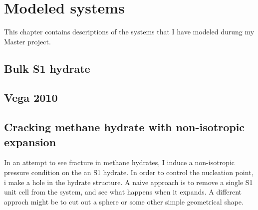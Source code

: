
\chapter{Modeled systems}
This chapter contains descriptions of the systems that I have modeled durung my Master project. 
\section{Bulk S1 hydrate}
\section{Vega 2010}
\section{Cracking methane hydrate with non-isotropic expansion}
In an attempt to see fracture in methane hydrates, I induce a non-isotropic pressure condition on the an S1 hydrate. In order to control the nucleation point, i make a hole in the hydrate structure. A naive approach is to remove a single S1 unit cell from the system, and see what happens when it expands. A different approch might be to cut out a sphere or some other simple geometrical shape. 


